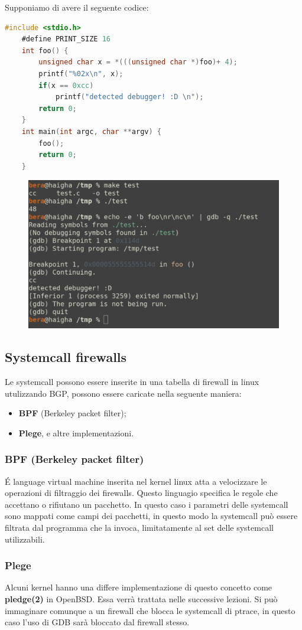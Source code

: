 Supponiamo di avere il seguente codice:
\begin{lstlisting}[language=C]
    #include <stdio.h>
    #define PRINT_SIZE 16
    int foo() {
        unsigned char x = *(((unsigned char *)foo)+ 4);
        printf("%02x\n", x);
        if(x == 0xcc)
            printf("detected debugger! :D \n");
        return 0;
    }
    int main(int argc, char **argv) {
        foo();
        return 0;
    }
\end{lstlisting}

\begin{figure}[h!]
    \centering
    \includegraphics[width=.5\linewidth]{res/anti_breakpoint.png}
    \caption{}
\end{figure}

\subsection{Systemcall firewalls}
Le systemcall possono essere inserite in una tabella di firewall in linux utulizzando BGP, possono essere caricate nella seguente maniera:
\begin{itemize}
    \item \textbf{BPF} (Berkeley packet filter);
    \item \textbf{Plege}, e altre implementazioni.
\end{itemize}

\subsubsection{BPF (Berkeley packet filter)}
É language virtual machine inserita nel kernel linux atta a velocizzare le operazioni di filtraggio dei firewalls. Questo linguagio specifica le regole che accettano o rifiutano un pacchetto.
In questo caso i parametri delle systemcall sono mappati come campi dei pacchetti, in questo modo la systemcall può essere filtrata dal programma che la invoca, limitatamente al set delle systemcall utilizzabili.

\subsubsection{Plege}
Alcuni kernel hanno una differe implementazione di questo concetto come \textbf{pledge(2)} in OpenBSD.
Essa verrà trattata nelle successive lezioni. Si può immaginare comunque a un firewall che blocca le systemcall di ptrace, in questo caso l'uso di GDB sarà bloccato dal firewall stesso.

